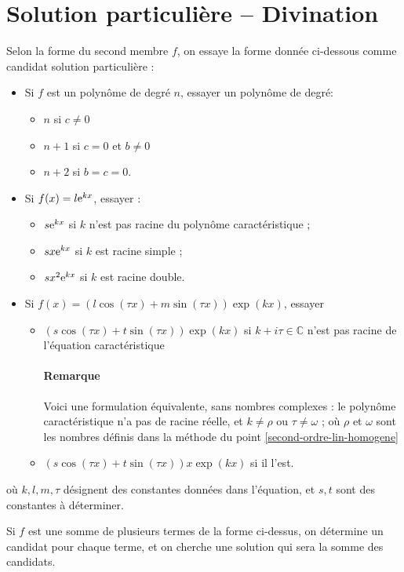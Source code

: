 \documentclass[french,oneside,twocolumn,article]{memoir} %
\newcommand*{\ens}[1]{\mathbb{#1}} %
\newcommand{\CC}{\ens C}%
\begin{document}
\section{Solution particulière -- Divination}
Selon la forme du second membre $f$, on essaye la forme donnée ci-dessous comme candidat \og solution particulière\fg{} :
\begin{itemize}
\item Si $f$ est un polynôme de degré $n$, essayer un polynôme de degré:
  \begin{itemize}
  \item $n$ si $c \neq 0$
  \item $n+1$ si $c = 0$ et $b \neq 0$
  \item $n+2$ si $b = c = 0$.
  \end{itemize}
\item Si $f(x) = l \textup{e}^{kx}$, essayer :
  \begin{itemize}
  \item $s \textup{e}^{kx}$ si $k$ n'est pas racine du polynôme caractéristique ;
  \item $s x \textup{e}^{kx}$ si $k$ est racine simple ;
  \item $s x^{2} \textup{e}^{kx}$ si $k$ est racine double.
  \end{itemize}
\item Si $f(x) = (l \cos(\tau x) + m \sin (\tau x)) \exp(k x)$, essayer
  \begin{itemize}
  \item $(s \cos(\tau x) + t \sin (\tau x)) \exp(k x)$ si $k + i \tau \in \CC$ n'est pas racine de l'équation caractéristique

    \paragraph{Remarque}
    Voici une formulation équivalente, sans nombres complexes : le polynôme caractéristique n'a pas de racine réelle, et $k \neq \rho$ ou $\tau \neq \omega$ ; où $\rho$ et $\omega$ sont les nombres définis dans la méthode du point \ref{second-ordre-lin-homogene}
    
  \item $(s \cos(\tau x) + t \sin (\tau x)) x \exp(k x)$ si il l'est.
  \end{itemize}
\end{itemize}
où $k,l,m,\tau$ désignent des constantes données dans l'équation, et $s,t$ sont des constantes à déterminer.

Si $f$ est une somme de plusieurs termes de la forme ci-dessus, on détermine un candidat pour chaque terme, et on cherche une solution qui sera la somme des candidats.
\end{document}
